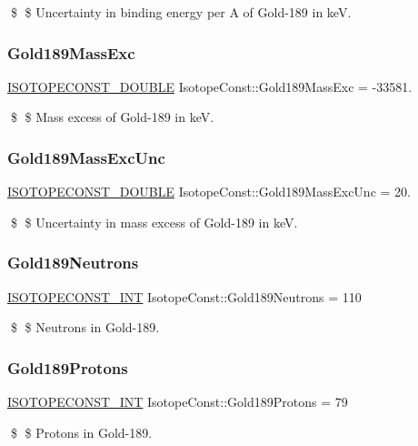 \$ \$ Uncertainty in binding energy per A of Gold-\/189 in keV. \mbox{\label{group___isotope_const-_gold-_au189_ga8e19f1c5969b437f111df8d36c027747}} 
\subsubsection{\texorpdfstring{Gold189\+Mass\+Exc}{Gold189MassExc}}
{\footnotesize\ttfamily \mbox{\hyperlink{group___isotope_const-_macros_ga8f45a7272ce02c0b4c65c44636ed719a}{I\+S\+O\+T\+O\+P\+E\+C\+O\+N\+S\+T\+\_\+\+D\+O\+U\+B\+LE}} Isotope\+Const\+::\+Gold189\+Mass\+Exc = -\/33581.}

\$ \$ Mass excess of Gold-\/189 in keV. \mbox{\label{group___isotope_const-_gold-_au189_ga318b309193036a5c73f63d6404fe769b}} 
\subsubsection{\texorpdfstring{Gold189\+Mass\+Exc\+Unc}{Gold189MassExcUnc}}
{\footnotesize\ttfamily \mbox{\hyperlink{group___isotope_const-_macros_ga8f45a7272ce02c0b4c65c44636ed719a}{I\+S\+O\+T\+O\+P\+E\+C\+O\+N\+S\+T\+\_\+\+D\+O\+U\+B\+LE}} Isotope\+Const\+::\+Gold189\+Mass\+Exc\+Unc = 20.}

\$ \$ Uncertainty in mass excess of Gold-\/189 in keV. \mbox{\label{group___isotope_const-_gold-_au189_ga24ac421d2bdfdb4f4e7780909c8bacd4}} 
\subsubsection{\texorpdfstring{Gold189\+Neutrons}{Gold189Neutrons}}
{\footnotesize\ttfamily \mbox{\hyperlink{group___isotope_const-_macros_ga5f18360b3e99483a35c32d789e62621c}{I\+S\+O\+T\+O\+P\+E\+C\+O\+N\+S\+T\+\_\+\+I\+NT}} Isotope\+Const\+::\+Gold189\+Neutrons = 110}

\$ \$ Neutrons in Gold-\/189. \mbox{\label{group___isotope_const-_gold-_au189_ga14fae94583d6a87fb711b3193a135f66}} 
\subsubsection{\texorpdfstring{Gold189\+Protons}{Gold189Protons}}
{\footnotesize\ttfamily \mbox{\hyperlink{group___isotope_const-_macros_ga5f18360b3e99483a35c32d789e62621c}{I\+S\+O\+T\+O\+P\+E\+C\+O\+N\+S\+T\+\_\+\+I\+NT}} Isotope\+Const\+::\+Gold189\+Protons = 79}

\$ \$ Protons in Gold-\/189. 